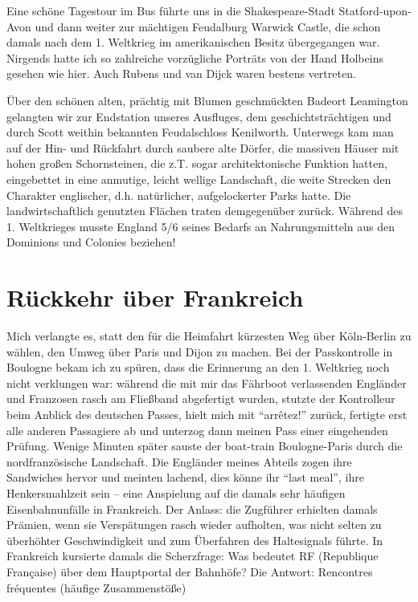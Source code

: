 \documentclass[a5paper,pagesize,10pt,twoside=true]{scrbook}
\renewcommand{\marginpar}[2][]{}
\begin{document}
Eine schöne Tagestour im Bus führte uns in die Shakespeare-Stadt Statford-upon-Avon und dann weiter zur mächtigen Feudalburg Warwick Castle, die schon damals nach dem 1. Weltkrieg im amerikanischen Besitz übergegangen war. Nirgends hatte ich so zahlreiche vorzügliche Porträts von der Hand Holbeins gesehen wie hier. Auch Rubens und van Dijck waren bestens vertreten.

Über den schönen alten, prächtig mit Blumen geschmückten Badeort Lea\-ming\-ton gelangten wir zur Endstation unseres Ausfluges, dem geschichtsträchtigen und durch Scott weithin bekannten Feudalschloss Kenilworth. Unterwegs kam man auf der Hin- und Rückfahrt durch saubere alte Dörfer, die massiven Häuser mit hohen großen Schornsteinen, die z.T. sogar architektonische Funktion hatten, eingebettet in eine anmutige, leicht wellige Landschaft, die weite Strecken den Charakter englischer, d.h. natürlicher, aufgelockerter Parks hatte. Die landwirtschaftlich genutzten Flächen traten demgegenüber zurück. Während des 1. Weltkrieges musste England 5/6 seines Bedarfs an Nahrungsmitteln aus den Dominions und Colonies beziehen!

\section{Rückkehr über Frankreich}
\marginpar{520}
Mich verlangte es, statt den für die Heimfahrt kürzesten Weg über Köln-Berlin zu wählen, den Umweg über Paris und Dijon zu machen. Bei der Passkontrolle in Boulogne bekam ich zu spüren, dass die Erinnerung an den 1. Weltkrieg noch nicht verklungen war: während die mit mir das Fährboot verlassenden Engländer und Franzosen rasch am Fließband abgefertigt wurden, stutzte der Kontrolleur beim Anblick des deutschen Passes, hielt mich mit \enquote{arrêtez!} zurück, fertigte erst alle anderen Passagiere ab und unterzog dann meinen Pass einer eingehenden Prüfung. Wenige Minuten später sauste der boat-train Boulogne-Paris durch die nordfranzösische Landschaft. Die Engländer meines Abteils zogen ihre Sandwiches hervor und meinten lachend, dies könne ihr \enquote{last meal}, ihre Henkersmahlzeit sein -- eine Anspielung auf die damals sehr häufigen Eisenbahnunfälle in Frankreich. Der Anlass: die Zugführer erhielten damals Prämien, wenn sie Verspätungen rasch wieder aufholten, was nicht selten zu überhöhter Geschwindigkeit und zum Überfahren des Haltesignals führte. In Frankreich kursierte damals die Scherzfrage: Was bedeutet RF (Republique Française) über dem Hauptportal der Bahnhöfe? Die Antwort: Rencontres fréquentes (häufige Zusammenstöße)
\end{document}
